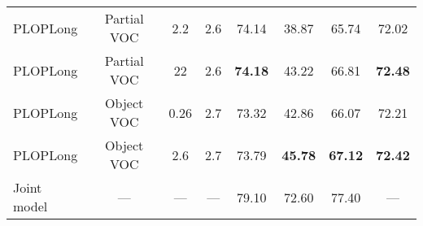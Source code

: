 \begin{table*}[t]
\begin{tabular}{@{}l|ccc|cccc@{}}
        \hdashline
        PLOPLong                                                & Partial VOC                                 & 2.2                               & 2.6                                & 74.14          & 38.87          & 65.74          & 72.02          \\
        PLOPLong                                                & Partial VOC                                 & 22                                & 2.6                                & \textbf{74.18} & 43.22          & 66.81          & \textbf{72.48} \\
        PLOPLong                                                & Object VOC                                  & 0.26                              & 2.7                                & 73.32          & 42.86          & 66.07          & 72.21          \\
        PLOPLong                                                & Object VOC                                  & 2.6                               & 2.7                                & 73.79          & \textbf{45.78} & \textbf{67.12} & \textbf{72.42} \\
        \midrule
        Joint model                                             & ---                                         & ---                               & ---                                & 79.10          & 72.60          & 77.40          & ---            \\
        \bottomrule
    \end{tabular}
\end{table*}
